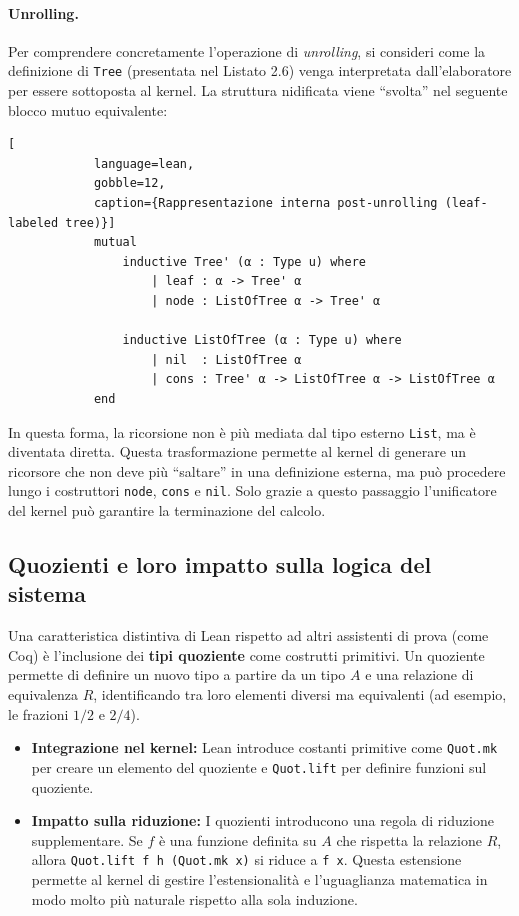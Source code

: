 \paragraph{Unrolling.}
Per comprendere concretamente l'operazione di \textit{unrolling}, si consideri come la definizione di \texttt{Tree} (presentata nel Listato 2.6) venga interpretata 
dall'elaboratore per essere sottoposta al kernel. La struttura nidificata viene ``svolta'' nel seguente blocco mutuo equivalente:
\begin{center}
    \begin{minipage}{0.85\textwidth}
        \begin{lstlisting}[
            language=lean, 
            gobble=12, 
            caption={Rappresentazione interna post-unrolling (leaf-labeled tree)}]
            mutual
                inductive Tree' (α : Type u) where
                    | leaf : α -> Tree' α
                    | node : ListOfTree α -> Tree' α

                inductive ListOfTree (α : Type u) where
                    | nil  : ListOfTree α
                    | cons : Tree' α -> ListOfTree α -> ListOfTree α
            end
        \end{lstlisting}
    \end{minipage}
\end{center}
In questa forma, la ricorsione non è più mediata dal tipo esterno \texttt{List}, ma è diventata diretta. Questa trasformazione permette al kernel di generare un 
ricorsore che non deve più ``saltare'' in una definizione esterna, ma può procedere lungo i costruttori \texttt{node}, \texttt{cons} e \texttt{nil}. Solo grazie 
a questo passaggio l'unificatore del kernel può garantire la terminazione del calcolo.

\subsection{Quozienti e loro impatto sulla logica del sistema}
Una caratteristica distintiva di Lean rispetto ad altri assistenti di prova (come Coq) è l'inclusione dei \textbf{tipi quoziente} come costrutti primitivi. Un 
quoziente permette di definire un nuovo tipo a partire da un tipo $A$ e una relazione di equivalenza $R$, identificando tra loro elementi diversi ma equivalenti 
(ad esempio, le frazioni $1/2$ e $2/4$).
\begin{itemize}
    \item \textbf{Integrazione nel kernel:} 
        Lean introduce costanti primitive come \texttt{Quot.mk} per creare un elemento del quoziente e \texttt{Quot.lift} per definire funzioni sul quoziente.
    \item \textbf{Impatto sulla riduzione:} 
        I quozienti introducono una regola di riduzione supplementare. Se $f$ è una funzione definita su $A$ che rispetta la relazione $R$, allora 
        \texttt{Quot.lift f h (Quot.mk x)} si riduce a \texttt{f x}. Questa estensione permette al kernel di gestire l'estensionalità e l'uguaglianza 
        matematica in modo molto più naturale rispetto alla sola induzione.
\end{itemize}

